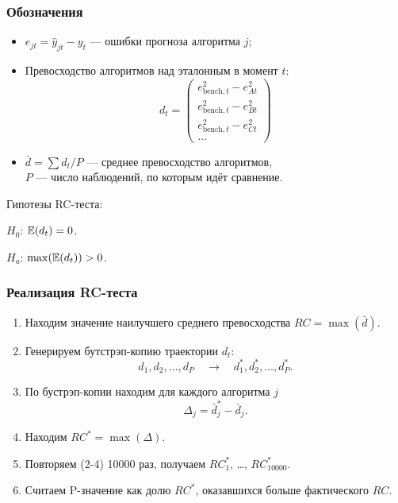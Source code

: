 \begin{frame}
    \frametitle{Обозначения}
    
    \begin{itemize}
        \item $e_{jt} = \hat y_{jt} - y_t$ — ошибки прогноза алгоритма $j$; \pause
        \item Превосходство алгоритмов над эталонным в момент $t$:
        \[
        d_t = \begin{pmatrix}
          e_{\text{bench}, t}^2 - e_{At}^2 \\
          e_{\text{bench}, t}^2 - e_{Bt}^2 \\          
          e_{\text{bench}, t}^2 - e_{Ct}^2 \\
          \ldots
        \end{pmatrix}  
        \] \pause
        \item $\bar d = \sum d_t / P$ —  среднее превосходство алгоритмов, \\
        $P$ — число наблюдений, по которым идёт сравнение.  
    \end{itemize}    
    \pause 
    Гипотезы RC-теста:
    
    $H_0$: $\mathbb{E}(d_t) = 0$. 

    $H_a$: $\max(\mathbb{E}(d_t)) > 0$.
\end{frame}




\begin{frame}
    \frametitle{Реализация RC-теста}

    \begin{enumerate}[<+->]
        \item Находим значение наилучшего среднего превосходства $RC = \max (\bar d)$.  
        \item Генерируем \alert{бутстрэп-копию} траектории $d_t$: 
        \[
        d_1, d_2, \ldots, d_P  \quad \to \quad     d_1^*, d_2^*, \ldots, d_P^*.
        \]
        \item По бустрэп-копии находим для каждого алгоритма $j$
        \[
            \Delta_j = \bar d^*_j - \bar d_j.
        \]
        \item Находим $RC^* = \max(\Delta)$.
        \item Повторяем (2-4) 10000 раз, получаем $RC^*_1$, \ldots, $RC^*_{10000}$.
        \item Считаем P-значение как долю $RC^*$, оказавшихся больше фактического $RC$.
    \end{enumerate}
\end{frame}

